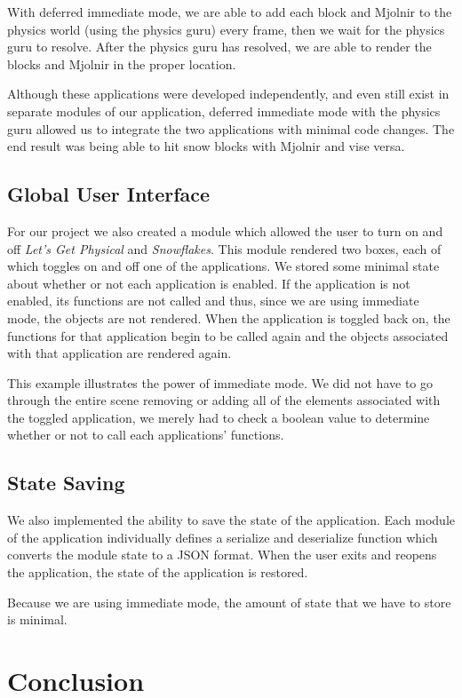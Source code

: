 \documentclass[conference,12pt]{IEEEtran}
\begin{document}
With deferred immediate mode, we are able to add each block and Mjolnir to the
physics world (using the physics guru) every frame, then we wait for the physics
guru to resolve. After the physics guru has resolved, we are able to render
the blocks and Mjolnir in the proper location.

Although these applications were developed independently, and even still exist
in separate modules of our application, deferred immediate mode with the physics
guru allowed us to integrate the two applications with minimal code changes. The
end result was being able to hit snow blocks with Mjolnir and vise versa.

\subsection{Global User Interface}
For our project we also created a module which allowed the user to turn on and
off \textit{Let's Get Physical} and \textit{Snowflakes}. This module rendered
two boxes, each of which toggles on and off one of the applications. We stored
some minimal state about whether or not each application is enabled. If the
application is not enabled, its functions are not called and thus, since we are
using immediate mode, the objects are not rendered. When the application is
toggled back on, the functions for that application begin to be called again and
the objects associated with that application are rendered again.

This example illustrates the power of immediate mode. We did not have to go
through the entire scene removing or adding all of the elements associated with
the toggled application, we merely had to check a boolean value to determine
whether or not to call each applications' functions.

\subsection{State Saving}
We also implemented the ability to save the state of the application. Each
module of the application individually defines a serialize and deserialize
function which converts the module state to a JSON format. When the user exits
and reopens the application, the state of the application is restored.

Because we are using
immediate mode, the amount of state that we have to store is minimal.

\section{Conclusion}\label{sec:conclusion}

{\printbibliography}
\end{document}
